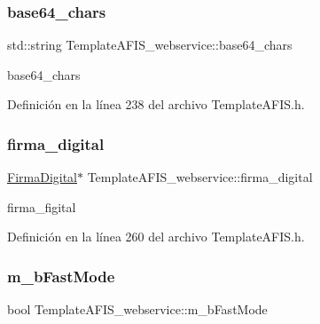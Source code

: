 \subsubsection{\texorpdfstring{base64\+\_\+chars}{base64\_chars}}
{\footnotesize\ttfamily std\+::string Template\+A\+F\+I\+S\+\_\+webservice\+::base64\+\_\+chars\hspace{0.3cm}{\ttfamily [private]}}



base64\+\_\+chars 



Definición en la línea 238 del archivo Template\+A\+F\+I\+S.\+h.

\hypertarget{classTemplateAFIS__webservice_a829e57a86d8c1c0b17631eebf8a8e0cf}{}\label{classTemplateAFIS__webservice_a829e57a86d8c1c0b17631eebf8a8e0cf} 
\subsubsection{\texorpdfstring{firma\+\_\+digital}{firma\_digital}}
{\footnotesize\ttfamily \hyperlink{classFirmaDigital}{Firma\+Digital}$\ast$ Template\+A\+F\+I\+S\+\_\+webservice\+::firma\+\_\+digital}



firma\+\_\+figital 



Definición en la línea 260 del archivo Template\+A\+F\+I\+S.\+h.

\hypertarget{classTemplateAFIS__webservice_a2c8421c26cc3dd7d6a3295ace4fd82ce}{}\label{classTemplateAFIS__webservice_a2c8421c26cc3dd7d6a3295ace4fd82ce} 
\subsubsection{\texorpdfstring{m\+\_\+b\+Fast\+Mode}{m\_bFastMode}}
{\footnotesize\ttfamily bool Template\+A\+F\+I\+S\+\_\+webservice\+::m\+\_\+b\+Fast\+Mode\hspace{0.3cm}{\ttfamily [private]}}



